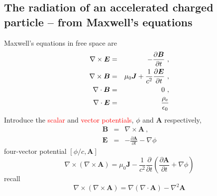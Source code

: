 \documentclass[12pt,a4paper]{article}
\renewcommand{\vec}[1]{\boldsymbol{#1}}
\begin{document}
\subsection{The radiation of an accelerated charged particle – from Maxwell’s equations}
Maxwell’s equations in free space are 
\begin{eqnarray}
\nabla \times \vec{E} &=& -\frac{\partial \vec{B}}{\partial t} ~,\\
\nabla \times \vec{B} &=& \mu_0 \vec{J} +\frac{1}{c^2}\frac{\partial \vec{E}}{\partial t} ~,\\
\nabla \cdot \vec{B} &=& 0 ~,\\
\nabla \cdot \vec{E} &=& \frac{\rho_{\rm e}}{\epsilon_0}
\end{eqnarray}
Introduce the \textcolor{red}{scalar} and \textcolor{red}{vector potentials}, $\phi$ and $\vec{A}$ respectively,
\begin{eqnarray}
\vec{B} &=& \nabla \times \vec{A} ~, \\
\vec{E} &=& -\frac{\partial \vec{A}}{\partial t} -\nabla \phi
\end{eqnarray}
four-vector potential $[\phi/c, \vec{A}]$ 
\begin{equation}
\nabla \times (\nabla \times \vec{A}) = \mu_0 \vec{J} -\frac{1}{c^2} \frac{\partial}{\partial t} \left(  \frac{\partial \vec{A}}{\partial t} +\nabla \phi \right)
\end{equation}
recall 
\begin{equation*}
\nabla \times (\nabla \times \vec{A})  = \nabla(\nabla\cdot \vec{A}) -\nabla^2 \vec{A}
\end{equation*}
\end{document}
